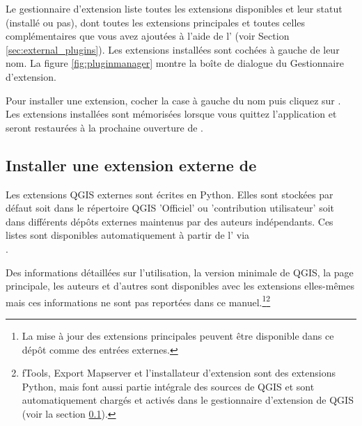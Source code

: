 Le gestionnaire d'extension liste toutes les extensions disponibles et leur statut 
(installé ou pas), dont toutes les extensions principales et toutes celles 
complémentaires que vous avez ajoutées à l'aide de l' 
(voir Section \ref{sec:external_plugins}). Les extensions installées 
sont cochées à gauche de leur nom. La figure \ref{fig:pluginmanager} montre la 
boîte de dialogue du Gestionnaire d'extension.

Pour installer une extension, cocher la case à gauche du nom puis cliquez sur 
. Les extensions installées sont mémorisées lorsque vous quittez 
l'application et seront restaurées à la prochaine ouverture de \qg.

\subsection{Installer une extension externe de \qg}\label{sec:load_external_plugin} 

Les extensions QGIS externes sont écrites en Python. Elles sont stockées par défaut 
soit dans le répertoire QGIS  'Officiel' ou 'contribution utilisateur' soit dans 
différents dépôts externes maintenus par des auteurs indépendants. Ces listes sont 
disponibles automatiquement à partir de l' 
via \\
.

Des informations détaillées sur l'utilisation, la version minimale de QGIS, la page 
principale, les auteurs et d'autres sont disponibles avec les extensions elles-mêmes 
mais ces informations ne sont pas reportées dans ce manuel.\footnote{La mise à jour 
des extensions principales peuvent être disponible dans ce dépôt comme des entrées 
externes.}\footnote{fTools, Export Mapserver et l'installateur d'extension sont 
des extensions Python, mais font aussi partie intégrale des sources de QGIS et 
sont automatiquement chargés et activés dans le gestionnaire d'extension de QGIS 
(voir la section \ref{sec:load_external_plugin}).}

